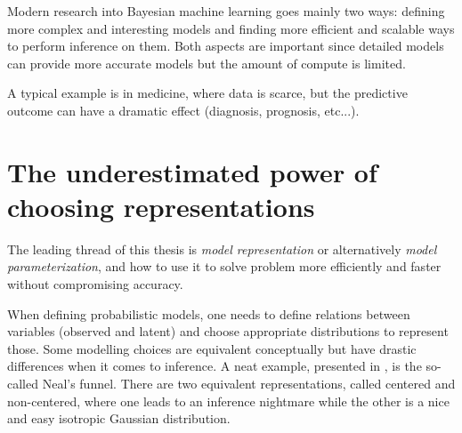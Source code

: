 Modern research into Bayesian machine learning goes mainly two ways: defining more complex and interesting models and finding more efficient and scalable ways to perform inference on them.
Both aspects are important since detailed models can provide more accurate models but the amount of compute is limited.

A typical example is in medicine, where data is scarce, but the predictive outcome can have a dramatic effect (diagnosis, prognosis, etc...).



\section{The underestimated power of choosing representations}

The leading thread of this thesis is \textit{model representation} or alternatively \textit{model parameterization}, and how to use it to solve problem more efficiently and faster without compromising accuracy.

When defining probabilistic models, one needs to define relations between variables (observed and latent) and choose appropriate distributions to represent those.
Some modelling choices are equivalent conceptually but have drastic differences when it comes to inference.
A neat example, presented in \citet{gorinovaAutomaticReparameterisationProbabilistic2020}, is the so-called Neal's funnel.
There are two equivalent representations, called centered and non-centered, where one leads to an inference nightmare while the other is a nice and easy isotropic Gaussian distribution.

